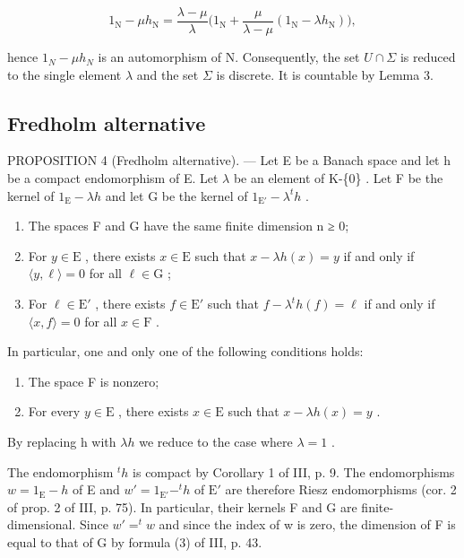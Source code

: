 \[
1 _ {\mathrm{N}} - \mu h _ {\mathrm{N}} = \frac {\lambda - \mu}{\lambda} \Big (1 _ {\mathrm{N}} + \frac {\mu}{\lambda - \mu} (1 _ {\mathrm{N}} - \lambda h _ {\mathrm{N}}) \Big),
\]

hence \(1_{N} - \mu h_{N}\) is an automorphism of N. Consequently, the set \(U \cap \Sigma\) is reduced to the single element \(\lambda\) and the set \(\Sigma\) is discrete. It is countable by Lemma 3.

\subsection{Fredholm alternative}

PROPOSITION 4 (Fredholm alternative). --- Let E be a Banach space and let h be a compact endomorphism of E. Let \(\lambda\) be an element of K-\{0\} . Let F be the kernel of \(1_{\mathrm{E}} - \lambda h\) and let G be the kernel of \(1_{\mathrm{E}'} - \lambda^{t}h\) .

\begin{enumerate}
\def\labelenumi{\alph{enumi})}
\item
  The spaces F and G have the same finite dimension n ≥ 0;
\item
  For \(y \in \mathrm{E}\) , there exists \(x \in \mathrm{E}\) such that \(x - \lambda h(x) = y\) if and only if \(\langle y, \ell \rangle = 0\) for all \(\ell \in \mathrm{G}\) ;
\item
  For \(\ell \in \mathrm{E}'\) , there exists \(f \in \mathrm{E}'\) such that \(f - \lambda^t h(f) = \ell\) if and only if \(\langle x, f \rangle = 0\) for all \(x \in \mathrm{F}\) .
\end{enumerate}

In particular, one and only one of the following conditions holds:

\begin{enumerate}
\def\labelenumi{(\roman{enumi})}
\item
  The space F is nonzero;
\item
  For every \(y \in \mathrm{E}\) , there exists \(x \in \mathrm{E}\) such that \(x - \lambda h(x) = y\) .
\end{enumerate}

By replacing h with \(\lambda h\) we reduce to the case where \(\lambda = 1\) .

The endomorphism \(^{t}h\) is compact by Corollary 1 of III, p. 9. The endomorphisms \(w = 1_{\mathrm{E}} - h\) of E and \(w' = 1_{\mathrm{E}'} - ^{t}h\) of \(\mathrm{E}'\) are therefore Riesz endomorphisms (cor. 2 of prop. 2 of III, p. 75). In particular, their kernels F and G are finite-dimensional. Since \(w' = ^{t}w\) and since the index of w is zero, the dimension of F is equal to that of G by formula (3) of III, p. 43.

